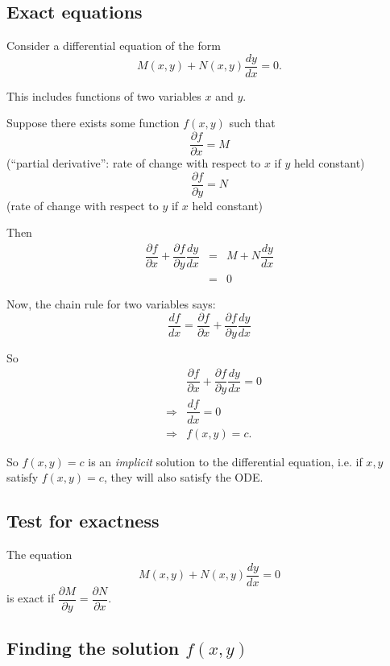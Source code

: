 
\subsection{Exact equations}  \label{sect:exact}

Consider a differential equation of the form 
\[
 M(x,y) + N(x,y) \dfrac{dy}{dx} = 0.
\]

This includes functions of two variables $x$ and $y$.

Suppose there exists some function $f(x,y)$ such that
\[
 \dfrac{\partial f}{\partial x} = M
\]
(``partial derivative'': rate of change with respect to $x$ if $y$ held constant)
\[
 \dfrac{\partial f}{\partial y} = N
\]
(rate of change with respect to $y$ if $x$ held constant)

Then
\begin{eqnarray*}
 \dfrac{\partial f}{\partial x} + \dfrac{\partial f}{\partial y} \dfrac{dy}{dx} &=& M + N \dfrac{dy}{dx}\\
 &=& 0
\end{eqnarray*}

Now, the chain rule for two variables says:
\[
 \dfrac{df}{dx} = \dfrac{\partial f}{\partial x} + \dfrac{\partial f}{\partial y} \dfrac{dy}{dx}
\]

So
\begin{eqnarray*}
 && \dfrac{\partial f}{\partial x} + \dfrac{\partial f}{\partial y} \dfrac{dy}{dx} = 0 \\
 &\Rightarrow& \dfrac{df}{dx} = 0\\
 &\Rightarrow& f(x,y) = c.
\end{eqnarray*}

So $f(x,y)=c$ is an \emph{implicit} solution to the differential equation, i.e. if $x,y$ satisfy $f(x,y)=c$, they will also satisfy the ODE.

\subsection*{Test for exactness}

The equation
\[
 M(x,y) + N(x,y) \dfrac{dy}{dx} = 0
\]
is exact if $\dfrac{\partial M}{\partial y}=\dfrac{\partial N}{\partial x}$.

\subsection*{Finding the solution $f(x,y)$}

